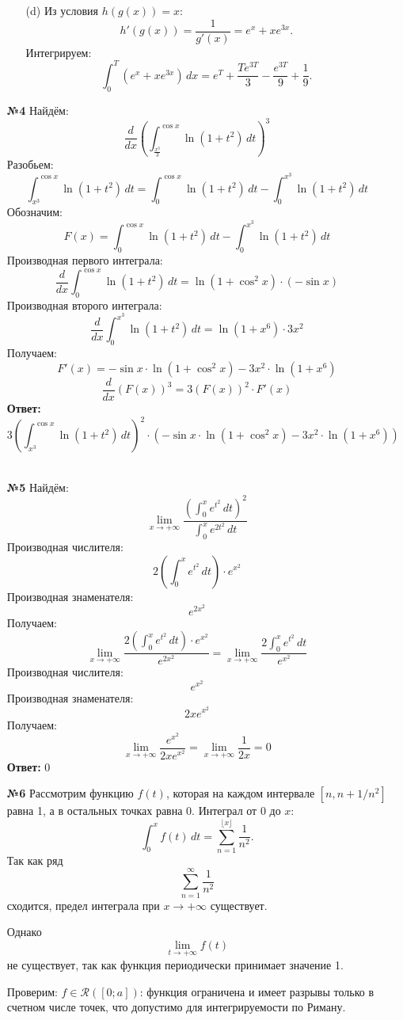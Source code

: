 \documentclass[a4paper]{article}
\begin{document}
\begin{enumerate}
\begin{enumerate}
        \item[(d)]Из условия \(h(g(x)) = x\):  
        \[
        h'(g(x)) = \frac{1}{g'(x)} = e^x + xe^{3x}.
        \]  
        Интегрируем:  
        \[
        \int_0^T (e^x + xe^{3x}) \, dx = e^T + \frac{T e^{3T}}{3} - \frac{e^{3T}}{9} + \frac{1}{9}.
        \]  

    \end{enumerate}


    \item[\textbf{№4}]Найдём:
    \[\frac{d}{dx} \left( \int_{\frac{x^3}{3}}^{\cos x} \ln(1 + t^2) \, dt \right)^3\]
    Разобьем:
    \[
    \int_{x^3}^{\cos x} \ln(1+t^2) \, dt = \int_{0}^{\cos x} \ln(1+t^2) \, dt - \int_{0}^{x^3} \ln(1+t^2) \, dt
    \]
    Обозначим:
    \[
    F(x) = \int_{0}^{\cos x} \ln(1+t^2) \, dt - \int_{0}^{x^3} \ln(1+t^2) \, dt
    \]
    Производная первого интеграла:
    \[
    \frac{d}{dx} \int_{0}^{\cos x} \ln(1+t^2) \, dt = \ln(1+\cos^2 x) \cdot (-\sin x)
    \]
    Производная второго интеграла:
    \[
    \frac{d}{dx} \int_{0}^{x^3} \ln(1+t^2) \, dt = \ln(1+x^6) \cdot 3x^2
    \]
    Получаем:
    \[
    F'(x) = -\sin x \cdot \ln(1+\cos^2 x) - 3x^2 \cdot \ln(1+x^6)
    \]
    \[
    \frac{d}{dx} \left(F(x)\right)^3 = 3 \left(F(x)\right)^2 \cdot F'(x)
    \]
    \textbf{Ответ:}
    \[
    3 \left( \int_{x^3}^{\cos x} \ln(1+t^2) \, dt \right)^2 \cdot \left( -\sin x \cdot \ln(1+\cos^2 x) - 3x^2 \cdot \ln(1+x^6) \right)
    \]\\

    \item[\textbf{№5}]Найдём:
    \[
    \lim_{x \to +\infty} \frac{\left( \int_0^x e^{t^2} \, dt \right)^2}{\int_0^x e^{2t^2} \, dt}
    \]
    Производная числителя:
    \[
    2 \left( \int_0^x e^{t^2} \, dt \right) \cdot e^{x^2}
    \]
    Производная знаменателя:
    \[
    e^{2x^2}
    \]
    Получаем:
    \[
    \lim_{x \to +\infty} \frac{2 \left( \int_0^x e^{t^2} \, dt \right) \cdot e^{x^2}}{e^{2x^2}} = \lim_{x \to +\infty} \frac{2 \int_0^x e^{t^2} \, dt}{e^{x^2}}
    \]
    Производная числителя:
    \[
    e^{x^2}
    \]
    Производная знаменателя:
    \[
    2x e^{x^2}
    \]
    Получаем:
    \[
    \lim_{x \to +\infty} \frac{e^{x^2}}{2x e^{x^2}} = \lim_{x \to +\infty} \frac{1}{2x} = 0
    \]
    \textbf{Ответ: } $0$\\

    \item[\textbf{№6}]Рассмотрим функцию \( f(t) \), которая на каждом интервале \([n, n + 1/n^2]\)  равна 1, а в остальных точках равна 0. 
    Интеграл от 0 до \( x \):  
    \[
    \int_0^x f(t) \, dt = \sum_{n=1}^{\lfloor x \rfloor} \frac{1}{n^2}.
    \]
    Так как ряд \[ \sum_{n=1}^{\infty} \frac{1}{n^2} \]
    сходится, предел интеграла при \( x \to +\infty \) существует.

    Однако \[ \lim_{t \to +\infty} f(t) \] не существует, так как функция периодически принимает значение 1.

    Проверим:
    \( f \in \mathcal{R}([0; a]) \): функция ограничена и имеет разрывы только в счетном числе точек, что допустимо для интегрируемости по Риману.

\end{enumerate}
\end{document}
